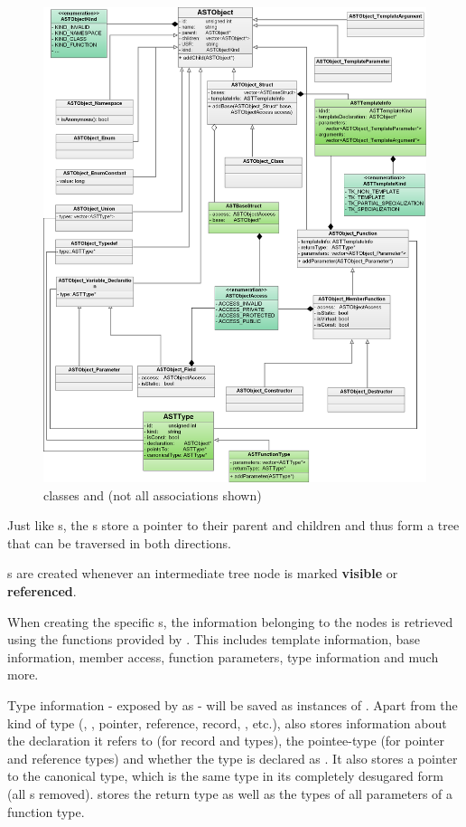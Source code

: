 \begin{figure}[p] %
	\centering
		\includegraphics[scale=0.2]{Images/ASTObjectUML.png}
	\caption{ classes and  (not all associations shown)}
	\label{fig:ASTObjectUML}
\end{figure}

\newpage
Just like s, the s store a pointer to their parent and children and thus form a tree that can be traversed in both directions.

s are created whenever an intermediate tree node is marked \textbf{visible} or \textbf{referenced}.

When creating the specific s, the information belonging to the nodes is retrieved using the functions provided by . This includes template information, base information, member access, function parameters, type information and much more.

Type information - exposed by  as  - will be saved as instances of . Apart from the kind of type (, , pointer, reference, record, , etc.),  also stores information about the declaration  it refers to (for record and  types), the pointee-type (for pointer and reference types) and whether the type is declared as . It also stores a pointer to the canonical type, which is the same type in its completely desugared form (all s removed).  stores the return type as well as the types of all parameters of a function type.

